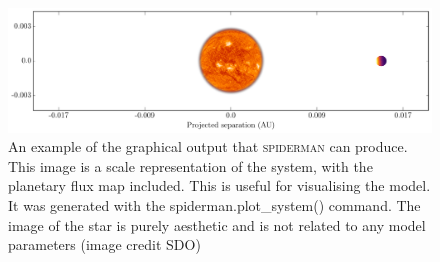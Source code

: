 \documentclass[a4paper,fleqn,usenatbib]{mnras}
\begin{document}










\begin{figure}
\begin{center}
\includegraphics[width=\textwidth]{img/system.pdf}
\caption{An example of the graphical output that \textsc{spiderman} can produce. This image is a scale representation of the system, with the planetary flux map included. This is useful for visualising the model. It was generated with the spiderman.plot\_system() command. The image of the star is purely aesthetic and is not related to any model parameters (image credit SDO)}
\label{fig:plot_system}
\end{center}
\end{figure}
\end{document}
